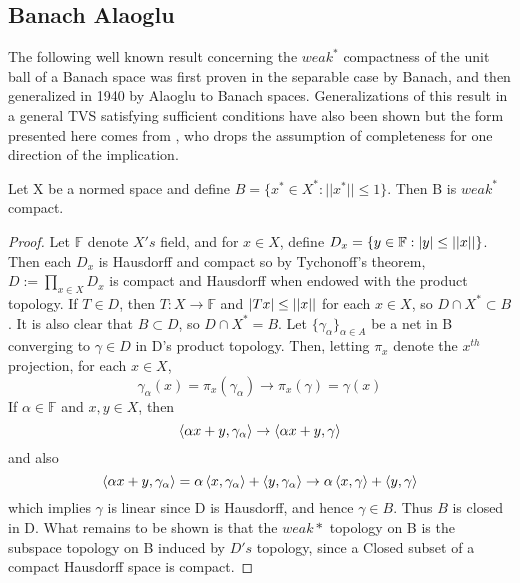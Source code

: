 \subsection{Banach Alaoglu}
The following well known result concerning the $weak^*$ compactness of the unit ball of a Banach space was first proven in the separable case by Banach, and then generalized in 1940 by Alaoglu \cite{alaoglu40} to Banach spaces. Generalizations of this result in a general TVS satisfying sufficient conditions have also been shown but the form presented here comes from \cite{hester07}, who drops the assumption of completeness for one direction of the implication. 
\begin{thm}
    \label{thm:banachalaoglu}
    Let X be a normed space and define $B=\{x^* \in X^*: ||x^*|| \leq 1\}$. Then B is $weak^*$ compact. 
    \begin{proof}
        Let $\mathbb{F}$ denote $X's$ field, and for $x \in X$, define $D_x=\{y \in \mathbb{F}: \left| y \right| \leq \left|\left| x \right|\right|\}$. 
        Then each $D_x$ is Hausdorff and compact so by Tychonoff's theorem, $D:=\prod_{x \in X} D_x$ is compact and Hausdorff when endowed with the product topology. 
        If $T \in D$, then $T:X \to \mathbb{F}$ and $\left| Tx \right| \leq \left|\left| x \right|\right|$ for each $x \in X$, so $D \cap X^* \subset B$. 
        It is also clear that $B \subset D$, so $D \cap X^* = B$. 
        Let $\{\gamma_\alpha\}_{\alpha \in A}$ be a net in B converging to $\gamma \in D$ in D's product topology. 
        Then, letting $\pi_x$ denote the $x^{th}$ projection, for each $x \in X$, 
        \begin{equation}
            \gamma_{\alpha}(x) = \pi_x(\gamma_\alpha) \to \pi_x(\gamma) = \gamma(x)
        \end{equation}
        If $\alpha \in \mathbb{F}$ and $x,y \in X$, then 
        \begin{equation}
            \left\langle \alpha x+y, \gamma_\alpha \right\rangle \to \left\langle  \alpha x+y, \gamma \right\rangle
        \end{equation}
        and also
        \begin{equation}
            \left\langle \alpha x+y,\gamma_\alpha \right\rangle = \alpha \left\langle x,\gamma_\alpha \right\rangle+ \left\langle y,\gamma_\alpha \right\rangle \to \alpha \left\langle x,\gamma \right\rangle+\left\langle y,\gamma \right\rangle
        \end{equation}
        which implies $\gamma$ is linear since D is Hausdorff, and hence $\gamma \in B$. 
        Thus $B$ is closed in D. What remains to be shown is that the $weak*$ topology on B is the subspace topology on B induced by $D's$ topology, since a Closed subset of a compact Hausdorff space is compact. 

\end{proof}
\end{thm}
